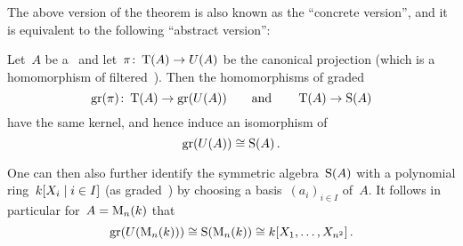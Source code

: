 The above version of the {\pbw} theorem is also known as the \enquote{concrete version}, and it is equivalent to the following \enquote{abstract version}:

\begin{theorem}[{\pbw}]
  Let~$A$ be a~{\kalg} and let~$\pi \colon \operatorname{T}(A) \to U(A)$ be the canonical projection (which is a homomorphism of filtered~{\kalg}).
  Then the homomorphisms of graded~{\kalgs}
  \[
            \operatorname{gr}(\pi)
    \colon  \operatorname{T}(A)
    \to     \operatorname{gr}(U(A))
    \qquad\text{and}\qquad
        \operatorname{T}(A)
    \to \operatorname{S}(A)
  \]
  have the same kernel, and hence induce an isomorphism of~{\kalgs}
  \[
          \operatorname{gr}(U(A))
    \cong \operatorname{S}(A) \,.
  \]
\end{theorem}

One can then also further identify the symmetric algebra~$\operatorname{S}(A)$ with a polynomial ring~$k[X_i \suchthat i \in I]$ (as graded~{\kalgs}) by choosing a basis~$(a_i)_{i \in I}$ of~$A$.
It follows in particular for~$A = \operatorname{M}_{n}(k)$ that
\[
        \operatorname{gr}(U(\operatorname{M}_{n}(k)))
  \cong \operatorname{S}(\operatorname{M}_{n}(k))
  \cong k[X_1, \dotsc, X_{n^2}] \,.
\]














